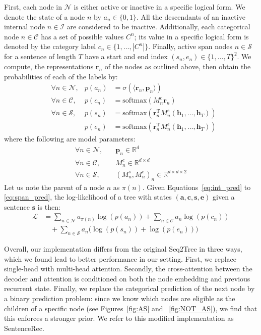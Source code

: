 First, each node in $\mathcal{N}$ is either active or inactive in a specific logical form. We denote the state of a node $n$ by ${a_n \in \{0, 1\}}$. All the descendants of an inactive internal node $n \in \mathcal{I}$ are considered to be inactive. Additionally, each categorical node $n \in \mathcal{C}$ has a set of possible values $C^n$; its value in a specific logical form is denoted by the category label ${c_n \in \{1,\ldots,|C^n|\}}$. Finally, active span nodes $n \in \mathcal{S}$ for a sentence of length $T$ have a start and end index ${(s_n, e_n) \in \{1,\ldots,T\}^2}$. We compute, the representations $\mathbf{r}_n$ of the nodes as outlined above, then obtain the probabilities of each of the labels by:
\begin{align}
&\forall n \in \mathcal{N}, &p(a_n) &= \sigma(\langle \mathbf{r}_n, \mathbf{p}_n \rangle) \label{eq:int_pred}\\
&\forall n \in \mathcal{C}, &p(c_n) &= \text{softmax}(M^c_n \mathbf{r}_n) \label{eq:cat_pred} \\
&\forall n \in \mathcal{S}, &p(s_n) &= \text{softmax}(\mathbf{r}_n ^{\text{T}} M^s_n (\mathbf{h}_1,\ldots, \mathbf{h}_T)) \nonumber \\
& &p(e_n) &= \text{softmax}(\mathbf{r}_n ^{\text{T}} M^e_n (\mathbf{h}_1,\ldots, \mathbf{h}_T)) \label{eq:span_pred}
\end{align}
where the following are model parameters:
\begin{align*}
\forall n \in \mathcal{N},& \quad \mathbf{p}_n \in \mathbb{R}^d\\
\forall n \in \mathcal{C},& \quad M^c_n \in \mathbb{R}^{d \times d} \\
\forall n \in \mathcal{S},& \quad (M^s_n, M^e_n) _n \in \mathbb{R}^{d \times d \times 2}
\end{align*}
Let us note the parent of a node $n$ as $\pi(n)$. Given Equations~\ref{eq:int_pred} to \ref{eq:span_pred}, the log-likelihood of a tree with states $(\textbf{a}, \textbf{c}, \textbf{s}, \textbf{e})$ given a sentence $\textbf{s}$ is then:
\begin{align}
\mathcal{L} & = \sum_{n \in \mathcal{N}} a_{\pi(n)} \log(p(a_n))  + \sum_{n \in \mathcal{C}} a_n \log(p(c_n)) \nonumber \\
& \quad + \sum_{n \in \mathcal{S}} a_n \Big(\log(p(s_n)) + \log(p(e_n))\Big)
\end{align}

Overall, our implementation differs from the original Seq2Tree in three ways,  which we found lead to better performance in our setting. First, we replace single-head with multi-head attention. Secondly, the cross-attention between the decoder and attention is conditioned on both the node embedding and previous recurrent state. Finally, we replace the categorical prediction of the next node by a binary prediction problem: since we know which nodes are eligible as the children of a specific node (see Figures~\ref{fig:AS} and ~\ref{fig:NOT_AS}), we find that this enforces a stronger prior. We refer to this modified implementation as SentenceRec.%


